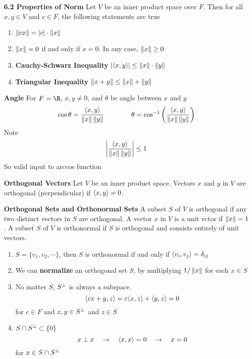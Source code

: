 \documentclass[11pt]{article}
\begin{document}
\begin{defn*}
    \textbf{6.2 Properties of Norm} Let $V$ be an inner product space over $F$. Then for all $x,y\in V$ and $c\in F$, the following statements are true 
    \begin{enumerate}
        \item $\left\lVert cx\right\rVert = |c| \cdot \left\lVert x\right\rVert$ 
        \item $\left\lVert x\right\rVert = 0$ if and only if $x=0$. In any case, $\left\lVert x\right\rVert \geq 0$ 
        \item \textbf{Cauchy-Schwarz Inequality} $|\langle x,y\rangle| \leq \left\lVert x\right\rVert \cdot \left\lVert y\right\rVert$
        \item \textbf{Triangular Inequality} $\left\lVert x+y\right\rVert \leq \left\lVert x\right\rVert + \left\lVert y\right\rVert$
    \end{enumerate}
\end{defn*}

\begin{defn*}
    \textbf{Angle} For $F=\R$, $x,y \neq 0$, and $\theta$ be angle between $x$ and $y$
    \[
        \cos{\theta} = \frac{\langle x,y\rangle}{\left\lVert x\right\rVert\left\lVert y\right\rVert}
        \quad \quad \quad \quad 
        \theta = \cos^{-1}\left( \frac{\langle x,y\rangle}{\left\lVert x\right\rVert\left\lVert y\right\rVert} \right)
    \]
    Note
    \[
        \left|\frac{\langle x,y\rangle}{\left\lVert x\right\rVert\left\lVert y\right\rVert}\right| \leq 1
    \]
    So valid input to arccos function
\end{defn*}

\begin{defn*}
    \textbf{Orthogonal Vectors} Let $V$ be an inner product space. Vectors $x$ and $y$ in $V$ are orthogonal (perpendicular) if $\langle x,y\rangle = 0$.
\end{defn*}

\begin{defn*}
    \textbf{Orthogonal Sets and Orthonormal Sets} A subset $S$ of $V$ is orthogonal if any two distinct vectors in $S$ are orthogonal. A vector $x$ in $V$ is a unit vctor if $\left\lVert x\right\rVert = 1$. A subset $S$ of $V$ is orthonormal if $S$ is orthogonal and consists entirely of unit vectors. 
    \begin{enumerate}
        \item $S = \{v_1,v_2,\cdots\}$, then $S$ is orthonormal if and only if $\langle v_i,v_j\rangle = \delta_{ij}$
        \item We can \textbf{normalize} an orthogonal set $S$, by multiplying $1/\left\lVert x\right\rVert$ for each $x\in S$
        \item No matter $S$, $S^{\perp}$ is always a subspace. 
        \[
            \langle cx+ y,z\rangle = c\langle x,z\rangle + \langle y,z\rangle = 0
        \]
        for $c\in F$  and $x,y \in S^{\perp}$ and $z\in S$
        \item $S \cap S^{\perp} \subset \{0\}$
        \[
            x \perp x 
            \quad \rightarrow \quad 
            \langle x,x\rangle = 0 
            \quad \rightarrow \quad 
            x = 0
        \]
        for $x\in S \cap S^{\perp}$
    \end{enumerate}
\end{defn*}
\end{document}
